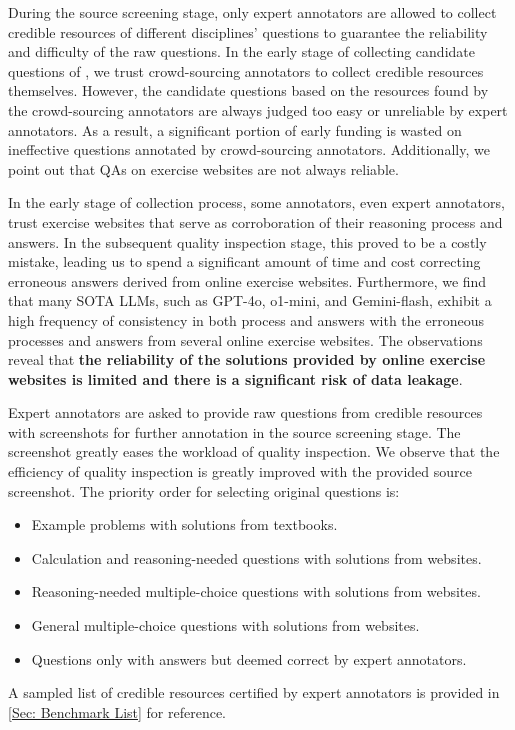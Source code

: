 During the source screening stage, only expert annotators are allowed to collect credible resources of different disciplines’ questions to guarantee the reliability and difficulty of the raw questions.
In the early stage of collecting candidate questions of \benchmark, we trust crowd-sourcing annotators to collect credible resources themselves.
However, the candidate questions based on the resources found by the crowd-sourcing annotators are always judged too easy or unreliable by expert annotators.
As a result, a significant portion of early funding is wasted on ineffective questions annotated by crowd-sourcing annotators.
Additionally, we point out that QAs on exercise websites are not always reliable. 

In the early stage of \benchmark collection process, some annotators, even expert annotators, trust exercise websites that serve as corroboration of their reasoning process and answers.
In the subsequent quality inspection stage, this proved to be a costly mistake, leading us to spend a significant amount of time and cost correcting erroneous answers derived from online exercise websites.
Furthermore, we find that many SOTA LLMs, such as GPT-4o, o1-mini, and Gemini-flash, exhibit a high frequency of consistency in both process and answers with the erroneous processes and answers from several online exercise websites. 
The observations reveal that \textbf{the reliability of the solutions provided by online exercise websites is limited and there is a significant risk of data leakage}.

Expert annotators are asked to provide raw questions from credible resources with screenshots for further annotation in the source screening stage.
The screenshot greatly eases the workload of quality inspection.
We observe that the efficiency of quality inspection is greatly improved with the provided source screenshot.
The priority order for selecting original questions is:
\begin{itemize}
    \item Example problems with solutions from textbooks.
    \item Calculation and reasoning-needed questions with solutions from websites.
    \item Reasoning-needed multiple-choice questions with solutions from websites.
    \item General multiple-choice questions with solutions from websites.
    \item Questions only with answers but deemed correct by expert annotators.
\end{itemize}
A sampled list of credible resources certified by expert annotators is provided in 
\autoref{Sec: Benchmark List} for reference.

